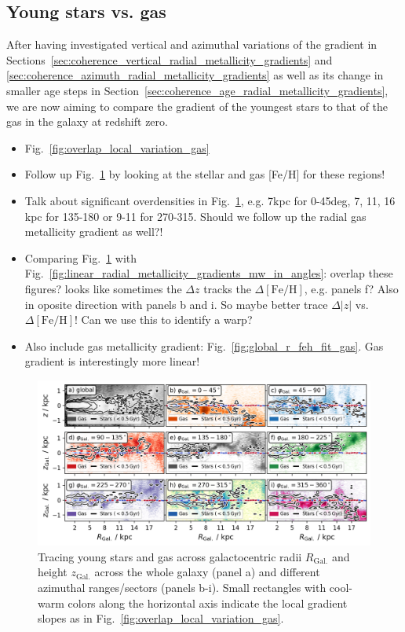 \documentclass[fleqn,usenatbib]{mnras}
\begin{document}
\subsection{Young stars vs. gas}
\label{sec:young_stars_vs_gas}

After having investigated vertical and azimuthal variations of the gradient in Sections~\ref{sec:coherence_vertical_radial_metallicity_gradients} and \ref{sec:coherence_azimuth_radial_metallicity_gradients} as well as its change in smaller age steps in Section~\ref{sec:coherence_age_radial_metallicity_gradients}, we are now aiming to compare the gradient of the youngest stars to that of the gas in the galaxy at redshift zero.

\begin{itemize}
    \item Fig.~\ref{fig:overlap_local_variation_gas}
    \item Follow up Fig.~\ref{fig:tracing_young_stars_and_gas_in_angles} by looking at the stellar and gas [Fe/H] for these regions!
    \item Talk about significant overdensities in Fig.~\ref{fig:tracing_young_stars_and_gas_in_angles}, e.g. 7kpc for 0-45deg, 7, 11, 16 kpc for 135-180 or 9-11 for 270-315. Should we follow up the radial gas metallicity gradient as well?!
    \item Comparing Fig.~\ref{fig:tracing_young_stars_and_gas_in_angles} with Fig.~\ref{fig:linear_radial_metallicity_gradients_mw_in_angles}: overlap these figures? looks like sometimes the $\Delta z$ tracks the $\Delta\mathrm{[Fe/H]}$, e.g. panels f? Also in oposite direction with panels b and i. So maybe better trace $\Delta \vert z \vert$ vs. $\Delta \mathrm{[Fe/H]}$! Can we use this to identify a warp?
    \item Also include gas metallicity gradient: Fig.~\ref{fig:global_r_feh_fit_gas}. Gas gradient is interestingly more linear!
\end{itemize}

\begin{figure}
    \centering
    \includegraphics[width=\columnwidth]{figures/tracing_young_stars_and_gas_in_angles.png}
    \caption{Tracing young stars and gas across galactocentric radii $R_\mathrm{Gal.}$ and height $z_\mathrm{Gal.}$ across the whole galaxy (panel a) and different azimuthal ranges/sectors (panels b-i). Small rectangles with cool-warm colors along the horizontal axis indicate the local gradient slopes as in Fig.~\ref{fig:overlap_local_variation_gas}.}
    \label{fig:tracing_young_stars_and_gas_in_angles}
\end{figure}
\end{document}
